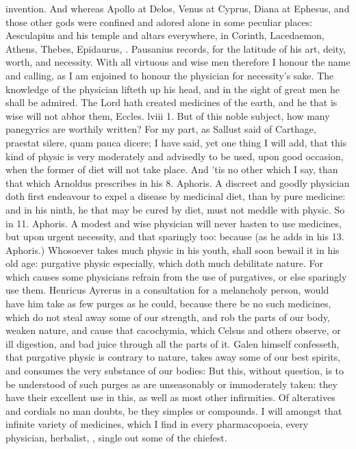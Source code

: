 {invention. And whereas Apollo at Delos, Venus at Cyprus, Diana at
Ephesus, and those other gods were confined and adored alone in some
peculiar places: Aesculapius and his temple and altars everywhere, in
Corinth, Lacedaemon, Athens, Thebes, Epidaurus, \etc{}. Pausanius records,
for the latitude of his art, deity, worth, and necessity. With all
virtuous and wise men therefore I honour the name and calling, as I am
enjoined to honour the physician for necessity's sake. The knowledge of
the physician lifteth up his head, and in the sight of great men he
shall be admired. The Lord hath created medicines of the earth, and he
that is wise will not abhor them, Eccles. lviii 1. But of this noble
subject, how many panegyrics are worthily written? For my part, as
Sallust said of Carthage, praestat silere, quam pauca dicere; I have
said, yet one thing I will add, that this kind of physic is very
moderately and advisedly to be used, upon good occasion, when the
former of diet will not take place. And 'tis no other which I say, than
that which Arnoldus prescribes in his 8. Aphoris. A discreet and
goodly physician doth first endeavour to expel a disease by medicinal
diet, than by pure medicine: and in his ninth, he that may be
cured by diet, must not meddle with physic. So in 11. Aphoris. A
modest and wise physician will never hasten to use medicines, but upon
urgent necessity, and that sparingly too: because (as he adds in his
13. Aphoris.) Whosoever takes much physic in his youth, shall
soon bewail it in his old age: purgative physic especially, which doth
much debilitate nature. For which causes some physicians refrain from
the use of purgatives, or else sparingly use them. Henricus
Ayrerus in a consultation for a melancholy person, would have him take
as few purges as he could, because there be no such medicines, which do
not steal away some of our strength, and rob the parts of our body,
weaken nature, and cause that cacochymia, which Celsus and others
observe, or ill digestion, and bad juice through all the parts of it.
Galen himself confesseth, that purgative physic is contrary to
nature, takes away some of our best spirits, and consumes the very
substance of our bodies: But this, without question, is to be
understood of such purges as are unseasonably or immoderately taken:
they have their excellent use in this, as well as most other
infirmities. Of alteratives and cordials no man doubts, be they simples
or compounds. I will amongst that infinite variety of medicines, which
I find in every pharmacopoeia, every physician, herbalist, \etc{}, single
out some of the chiefest.

}
